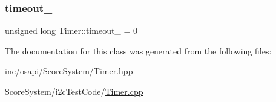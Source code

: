 \mbox{\label{class_timer_a474478436edc2312ce9d0a375aff403a}} 
\subsubsection{\texorpdfstring{timeout\+\_\+}{timeout\_}}
{\footnotesize\ttfamily unsigned long Timer\+::timeout\+\_\+ = 0\hspace{0.3cm}{\ttfamily [private]}}



The documentation for this class was generated from the following files\+:\begin{DoxyCompactItemize}
\item 
inc/osapi/\+Score\+System/\hyperlink{_timer_8hpp}{Timer.\+hpp}\item 
Score\+System/i2c\+Test\+Code/\hyperlink{i2c_test_code_2_timer_8cpp}{Timer.\+cpp}\end{DoxyCompactItemize}
